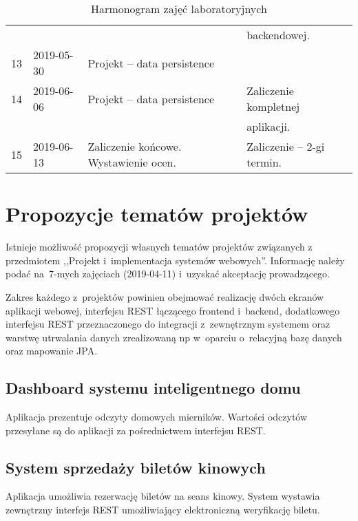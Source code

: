 \documentclass[12pt]{article}
\begin{document}
\begin{table}
\begin{tabular}{|r|l|l|l|}
                &           &                                           & backendowej.\\
            13  & 2019-05-30& Projekt -- data persistence               &\\
            14  & 2019-06-06& Projekt -- data persistence               & Zaliczenie kompletnej\\
                &           &                                           & aplikacji.\\
            15  & 2019-06-13& Zaliczenie końcowe. Wystawienie ocen.     & Zaliczenie -- 2-gi termin.\\
            \hline
        \end{tabular}
        \caption{Harmonogram zajęć laboratoryjnych}
        \label{harmonogram}
    \end{table}

    \section*{Propozycje tematów projektów}

        \noindent Istnieje możliwość  propozycji własnych tematów projektów związanych z przedmiotem ,,Projekt i~implementacja systemów webowych''. Informację należy podać na~7-mych zajęciach (2019-04-11) i~uzyskać akceptację prowadzącego.

        Zakres każdego z~projektów powinien obejmować realizację dwóch ekranów aplikacji webowej, interfejsu REST łączącego frontend i~backend, dodatkowego interfejsu REST przeznaczonego do integracji z~zewnętrznym systemem oraz warstwę utrwalania danych zrealizowaną np w~oparciu o~relacyjną bazę danych oraz mapowanie JPA.

        \subsection*{Dashboard systemu inteligentnego domu}
            Aplikacja prezentuje odczyty domowych mierników. Wartości odczytów przesyłane są do aplikacji za pośrednictwem interfejsu REST.

        \subsection*{System sprzedaży biletów kinowych}
            Aplikacja umożliwia rezerwację biletów na seans kinowy. System wystawia zewnętrzny interfejs REST umożliwiający elektroniczną weryfikację biletu.
\end{document}
